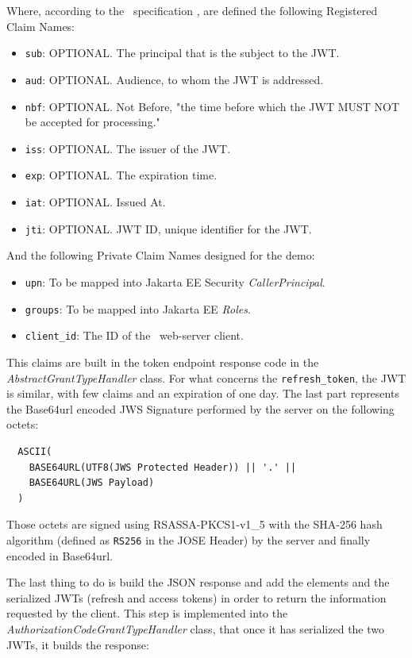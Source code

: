 \noindent Where, according to the \ specification \cite{RFC7519}, are defined the following Registered Claim Names:

\begin{itemize}
    \item \texttt{sub}: OPTIONAL. The principal that is the subject to the JWT.
    \item \texttt{aud}: OPTIONAL. Audience, to whom the JWT is addressed.
    \item \texttt{nbf}: OPTIONAL. Not Before, "the time before which the JWT MUST NOT be accepted for processing." \cite{RFC7519}
    \item \texttt{iss}: OPTIONAL. The issuer of the JWT.
    \item \texttt{exp}: OPTIONAL. The expiration time.
    \item \texttt{iat}: OPTIONAL. Issued At.
    \item \texttt{jti}: OPTIONAL. JWT ID, unique identifier for the JWT.
\end{itemize}

\noindent And the following Private Claim Names designed for the demo:

\begin{itemize}
    \item \texttt{upn}: To be mapped into Jakarta EE Security \textit{CallerPrincipal}.
    \item \texttt{groups}: To be mapped into Jakarta EE \textit{Roles}.
    \item \texttt{client\_id}: The ID of the \oauth\ web-server client.
\end{itemize}

\noindent This claims are built in the token endpoint response code in the \textit{AbstractGrantTypeHandler} class. For what concerns the \texttt{refresh\_token}, the JWT is similar, with few claims and an expiration of one day.
The last part represents the Base64url encoded JWS Signature performed by the server on the following octets:
\begin{lstlisting}
  ASCII(
    BASE64URL(UTF8(JWS Protected Header)) || '.' ||
    BASE64URL(JWS Payload)
  )
\end{lstlisting}

\noindent Those octets are signed using RSASSA-PKCS1-v1\_5 with the SHA-256 hash algorithm (defined as \texttt{RS256} in the JOSE Header) by the server and finally encoded in Base64url.

The last thing to do is build the JSON response and add the elements and the serialized JWTs (refresh and access tokens) in order to return the information requested by the client. This step is implemented into the \textit{AuthorizationCodeGrantTypeHandler} class, that once it has serialized the two JWTs, it builds the response:

